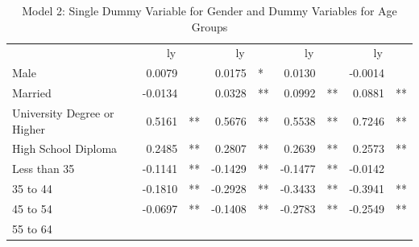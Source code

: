 \documentclass[12pt]{article}
\begin{document}
\begin{table}[!h]
\caption{Model 2: Single Dummy Variable for Gender and Dummy Variables for Age Groups}
\centering
\begin{tabular}{lllllllll}
\cline{1-9}
\multicolumn{1}{r}{} &
  \multicolumn{2}{c}{ly} &
  \multicolumn{2}{c}{ly} &
  \multicolumn{2}{c}{ly} &
  \multicolumn{2}{c}{ly} \\
\cline{1-9}
\multicolumn{1}{l}{Male} &
  \multicolumn{1}{r}{0.0079} &
  \multicolumn{1}{l}{} &
  \multicolumn{1}{r}{0.0175} &
  \multicolumn{1}{l}{*} &
  \multicolumn{1}{r}{0.0130} &
  \multicolumn{1}{l}{} &
  \multicolumn{1}{r}{-0.0014} &
  \multicolumn{1}{l}{} \\
\multicolumn{1}{l}{Married} &
  \multicolumn{1}{r}{-0.0134} &
  \multicolumn{1}{l}{} &
  \multicolumn{1}{r}{0.0328} &
  \multicolumn{1}{l}{**} &
  \multicolumn{1}{r}{0.0992} &
  \multicolumn{1}{l}{**} &
  \multicolumn{1}{r}{0.0881} &
  \multicolumn{1}{l}{**} \\
\multicolumn{1}{l}{University Degree or Higher} &
  \multicolumn{1}{r}{0.5161} &
  \multicolumn{1}{l}{**} &
  \multicolumn{1}{r}{0.5676} &
  \multicolumn{1}{l}{**} &
  \multicolumn{1}{r}{0.5538} &
  \multicolumn{1}{l}{**} &
  \multicolumn{1}{r}{0.7246} &
  \multicolumn{1}{l}{**} \\
\multicolumn{1}{l}{High School Diploma} &
  \multicolumn{1}{r}{0.2485} &
  \multicolumn{1}{l}{**} &
  \multicolumn{1}{r}{0.2807} &
  \multicolumn{1}{l}{**} &
  \multicolumn{1}{r}{0.2639} &
  \multicolumn{1}{l}{**} &
  \multicolumn{1}{r}{0.2573} &
  \multicolumn{1}{l}{**} \\
\multicolumn{1}{l}{Less than 35} &
  \multicolumn{1}{r}{-0.1141} &
  \multicolumn{1}{l}{**} &
  \multicolumn{1}{r}{-0.1429} &
  \multicolumn{1}{l}{**} &
  \multicolumn{1}{r}{-0.1477} &
  \multicolumn{1}{l}{**} &
  \multicolumn{1}{r}{-0.0142} &
  \multicolumn{1}{l}{} \\
\multicolumn{1}{l}{35 to 44} &
  \multicolumn{1}{r}{-0.1810} &
  \multicolumn{1}{l}{**} &
  \multicolumn{1}{r}{-0.2928} &
  \multicolumn{1}{l}{**} &
  \multicolumn{1}{r}{-0.3433} &
  \multicolumn{1}{l}{**} &
  \multicolumn{1}{r}{-0.3941} &
  \multicolumn{1}{l}{**} \\
\multicolumn{1}{l}{45 to 54} &
  \multicolumn{1}{r}{-0.0697} &
  \multicolumn{1}{l}{**} &
  \multicolumn{1}{r}{-0.1408} &
  \multicolumn{1}{l}{**} &
  \multicolumn{1}{r}{-0.2783} &
  \multicolumn{1}{l}{**} &
  \multicolumn{1}{r}{-0.2549} &
  \multicolumn{1}{l}{**} \\
\multicolumn{1}{l}{55 to 64} &

\end{tabular}
\end{table}
\end{document}

